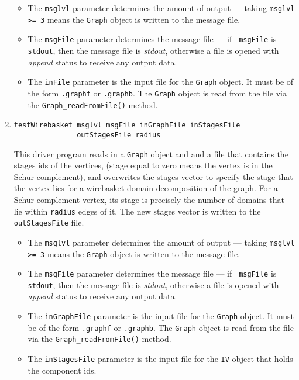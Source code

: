 \begin{enumerate}
\begin{itemize}
\item
The {\tt msglvl} parameter determines the amount of output ---
taking {\tt msglvl >= 3} means the {\tt Graph} object is written
to the message file.
\item
The {\tt msgFile} parameter determines the message file --- if {\tt
msgFile} is {\tt stdout}, then the message file is {\it stdout},
otherwise a file is opened with {\it append} status to receive any
output data.
\item
The {\tt inFile} parameter is the input file for the {\tt Graph}
object. It must be of the form {\tt *.graphf} or {\tt *.graphb}.
The {\tt Graph} object is read from the file via the
{\tt Graph\_readFromFile()} method.
\end{itemize}
\item
\begin{verbatim}
testWirebasket msglvl msgFile inGraphFile inStagesFile
               outStagesFile radius
\end{verbatim}
This driver program reads in a {\tt Graph} object and 
and a file that contains the stages ids of the vertices,
(stage equal to zero means the vertex is in the Schur complement),
and overwrites the stages vector to specify the stage that the
vertex lies for a wirebasket domain decomposition of the graph.
For a Schur complement vertex, its stage is precisely the number of
domains that lie within {\tt radius} edges of it.
The new stages vector is written to the {\tt outStagesFile} file.
\par
\begin{itemize}
\item
The {\tt msglvl} parameter determines the amount of output ---
taking {\tt msglvl >= 3} means the {\tt Graph} object is written
to the message file.
\item
The {\tt msgFile} parameter determines the message file --- if {\tt
msgFile} is {\tt stdout}, then the message file is {\it stdout},
otherwise a file is opened with {\it append} status to receive any
output data.
\item
The {\tt inGraphFile} parameter is the input file for the {\tt Graph}
object. It must be of the form {\tt *.graphf} or {\tt *.graphb}.
The {\tt Graph} object is read from the file via the
{\tt Graph\_readFromFile()} method.
\item
The {\tt inStagesFile} parameter is the input file for the {\tt IV}
object that holds the component ids. 

\end{itemize}
\end{enumerate}

